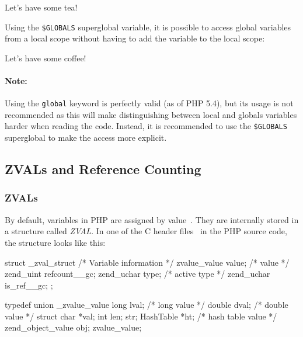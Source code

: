 \begin{textcode}
Let's have some tea!
\end{textcode}

Using the \texttt{\$GLOBALS} superglobal variable, it is possible to access global variables from a local scope without having to add the variable to the local scope:


\begin{textcode}
Let's have some coffee!
\end{textcode}

\paragraph{Note:} Using the \texttt{global} keyword is perfectly valid (as of PHP 5.4), but its usage is not recommended as this will make distinguishing between local and globals variables harder when reading the code. Instead, it is recommended to use the \texttt{\$GLOBALS} superglobal to make the access more explicit. ~\cite{typo3-cgl-php-syntax-formatting}



\subsection{ZVALs and Reference Counting}

\subsubsection{ZVALs}
\label{sec:zvals}

By default, variables in PHP are assigned by value~\cite{php-manual-variables}. They are internally stored in a structure called \emph{ZVAL}. In one of the C header files~\cite{php-src-api-headers} in the PHP source code, the structure looks like this:

\begin{ccode}
struct _zval_struct {
  /* Variable information */
  zvalue_value value;       /* value */
  zend_uint refcount__gc;
  zend_uchar type;          /* active type */
  zend_uchar is_ref__gc;
};

typedef union _zvalue_value {
  long lval;     /* long value */
  double dval;   /* double value */
  struct {
    char *val;
    int len;
  } str;
  HashTable *ht;  /* hash table value */
  zend_object_value obj;
} zvalue_value;
\end{ccode}

